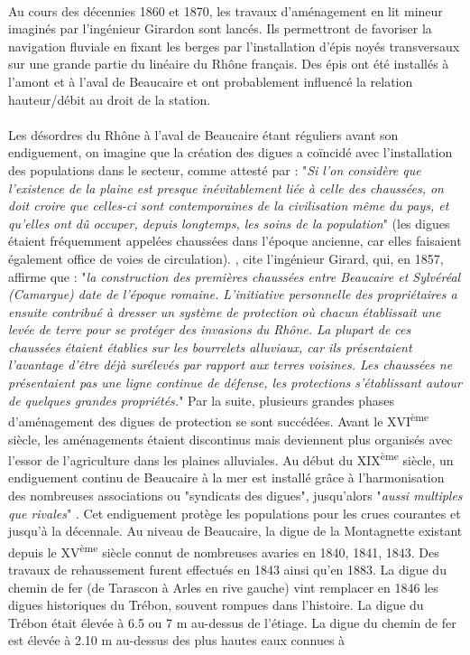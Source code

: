 \documentclass[11pt]{article}
\begin{document}
		\paragraph{} Au cours des décennies 1860 et 1870, les travaux d'aménagement en lit mineur imaginés par l'ingénieur Girardon sont lancés. Ils permettront de favoriser la navigation fluviale en fixant les berges par l'installation d'épis noyés transversaux sur une grande partie du linéaire du Rhône français. Des épis ont été installés à l'amont et à l'aval de Beaucaire et ont probablement influencé la relation hauteur/débit au droit de la station.
    
		\paragraph{} Les désordres du Rhône à l'aval de Beaucaire étant réguliers avant son endiguement, on imagine que la création des digues a coïncidé avec l'installation des populations dans le secteur, comme attesté par \citet{surell_memoire_1847} : "\textit{Si l'on considère que l'existence de la plaine est presque inévitablement liée à celle des chaussées, on doit croire que celles-ci sont contemporaines de la civilisation même du pays, et qu'elles ont dû occuper, depuis longtemps, les soins de la population}" (les digues étaient fréquemment appelées chaussées dans l'époque ancienne, car elles faisaient également office de voies de circulation). \citet{mejean_etude_2017}, cite l'ingénieur Girard, qui, en 1857, affirme que : "\textit{la construction des premières chaussées entre Beaucaire et Sylvéréal (Camargue) date de l'époque romaine. L'initiative personnelle des propriétaires a ensuite contribué à dresser un système de protection où chacun établissait une levée de terre pour se protéger des invasions du Rhône. La plupart de ces chaussées étaient établies sur les bourrelets alluviaux, car ils présentaient l'avantage d'être déjà surélevés par rapport aux terres voisines. Les chaussées ne présentaient pas une ligne continue de défense, les protections s'établissant autour de quelques grandes propriétés.}" Par la suite, plusieurs grandes phases d'aménagement des digues de protection se sont succédées. Avant le XVI\textsuperscript{ème} siècle, les aménagements étaient discontinus mais deviennent plus organisés avec l'essor de l'agriculture dans les plaines alluviales. Au début du XIX\textsuperscript{ème} siècle, un endiguement continu de Beaucaire à la mer est installé grâce à l'harmonisation des nombreuses associations ou "syndicats des digues", jusqu'alors "\textit{aussi multiples que rivales}" \citep{pichard_sept_2014}. Cet endiguement protège les populations pour les crues courantes et jusqu'à la décennale. Au niveau de Beaucaire, la digue de la Montagnette existant depuis le XV\textsuperscript{ème} siècle connut de nombreuses avaries en 1840, 1841, 1843. Des travaux de rehaussement furent effectués en 1843 ainsi qu'en 1883. La digue du chemin de fer (de Tarascon à Arles en rive gauche) vint remplacer en 1846 les digues historiques du Trébon, souvent rompues dans l'histoire. La digue du Trébon était élevée à 6.5 ou 7 m au-dessus de l'étiage. La digue du chemin de fer est élevée à 2.10 m au-dessus des plus hautes eaux connues à 
\end{document}
